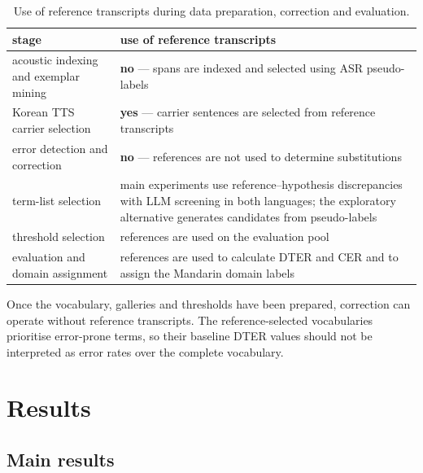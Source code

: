 \documentclass{article}
\begin{document}
\begin{table}[t]
\centering
\caption{Use of reference transcripts during data preparation, correction and
evaluation.}
\label{tab:refuse}
\setlength{\tabcolsep}{3.5pt}\small
\begin{tabular}{@{}p{2.6cm}p{5.3cm}@{}}
\toprule
stage & use of reference transcripts \\
\midrule
acoustic indexing and exemplar mining & \textbf{no} --- spans are indexed and
  selected using ASR pseudo-labels \\[2pt]
Korean TTS carrier selection & \textbf{yes} --- carrier sentences are selected
  from reference transcripts \\[2pt]
error detection and correction & \textbf{no} --- references are not used to
  determine substitutions \\[2pt]
term-list selection & main experiments use reference--hypothesis discrepancies
  with LLM screening in both languages; the exploratory alternative generates
  candidates from pseudo-labels \\[2pt]
threshold selection & references are used on the evaluation pool \\[2pt]
evaluation and domain assignment & references are used to calculate DTER and
  CER and to assign the Mandarin domain labels \\
\bottomrule
\end{tabular}
\end{table}

\noindent Once the vocabulary, galleries and thresholds have been prepared, correction can operate without reference transcripts. The reference-selected vocabularies prioritise error-prone terms, so their baseline DTER values should not be interpreted as error rates over the complete vocabulary.

\section{Results}
\subsection{Main results}
\label{sec:main}
\end{document}
